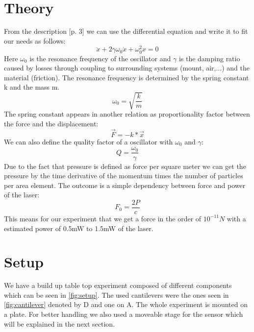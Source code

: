 \documentclass[12pt,a4paper]{article}
\begin{document}
\section{Theory}
\label{theory}
From the description \cite{physikwiki}[p. 3] we can use the differential equation and write it to fit our needs as follows:
$$\ddot{x} + 2\gamma \omega_0 \dot{x} + \omega_0^2 x = 0$$
Here $\omega_{0}$ is the resonance frequency of the oscillator and $\gamma$ is the damping ratio caused by losses through coupling to surrounding systems (mount, air,...) and the material (friction).
The resonance frequency is determined by the spring constant k and the mass m.
$$\omega_0 = \sqrt{\frac{k}{m}}$$
The spring constant appears in another relation as proportionality factor between the force and the displacement:
$$\vec{F} = -k*\vec{x}$$
We can also define the quality factor of a oscillator with $\omega_{0}$ and $\gamma$:
$$Q = \frac{\omega_{0}}{\gamma}$$
Due to the fact that pressure is defined as force per square meter we can get the pressure by the time derivative of the momentum times the number of particles per area element. The outcome is a simple dependency between force and power of the laser:
$$F_0 = \frac{2P}{c}$$
This means for our experiment that we get a force in the order of $10^{-11}N$ with a estimated power of 0.5mW to 1.5mW of the laser.

\pagebreak
\section{Setup}
We have a build up table top experiment composed of different components which can be seen in \ref{fig:setup}. The used cantilevers were the ones seen in \ref{fig:cantilever} denoted by D and one on A. The whole experiment is mounted on a plate. For better handling we also used a moveable stage for the sensor which will be explained in the next section.
\end{document}
